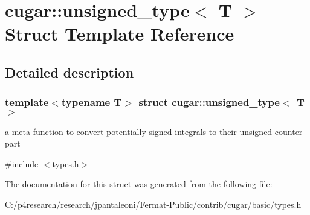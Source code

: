 \hypertarget{structcugar_1_1unsigned__type}{}\section{cugar\+:\+:unsigned\+\_\+type$<$ T $>$ Struct Template Reference}
\label{structcugar_1_1unsigned__type}


\subsection{Detailed description}
\subsubsection*{template$<$typename T$>$\newline
struct cugar\+::unsigned\+\_\+type$<$ T $>$}

a meta-\/function to convert potentially signed integrals to their unsigned counter-\/part 

{\ttfamily \#include $<$types.\+h$>$}



The documentation for this struct was generated from the following file\+:\begin{DoxyCompactItemize}
\item 
C\+:/p4research/research/jpantaleoni/\+Fermat-\/\+Public/contrib/cugar/basic/types.\+h\end{DoxyCompactItemize}

